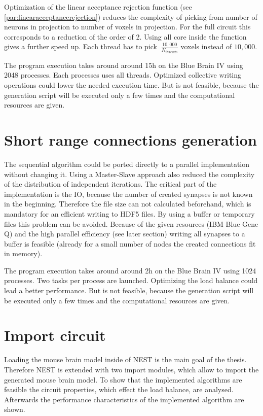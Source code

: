 Optimization of the linear acceptance rejection function (see \ref{par:linearacceptancerejection})
reduces the complexity of picking from number of neurons in projection to number of voxels in projection.
For the full circuit this corresponds to a reduction of the order of 2.
Using all core inside the function gives a further speed up.
Each thread has to pick $~\frac{10,000}{N_{threads}}$ voxels instead of
$10,000$.

The program execution takes around around 15h on the Blue Brain IV using 2048 processes.
Each processes uses all threads. Optimized collective writing operations could 
lower the needed execution time.
But is not feasible, because the generation script will be executed only a few times
and the computational resources are given.



\section{Short range connections generation}
The sequential algorithm could be ported directly to a parallel implementation without changing it.
Using a Master-Slave approach also reduced the complexity of the distribution of independent iterations.
The critical part of the implementation is the IO, because the number of created synapses is not known in the beginning.
Therefore the file size can not calculated beforehand, which is mandatory for an efficient writing to HDF5 files. 
By using a buffer or temporary files this problem can be avoided.
Because of the given resources (IBM Blue Gene Q) and the high parallel efficiency (see later section)
writing all synapses to a buffer is feasible (already for a small number of nodes the created connections fit in memory).

The program execution takes around around 2h on the Blue Brain IV using 1024 processes.
Two tasks per process are launched. Optimizing the load balance could lead a better performance.
But is not feasible, because the generation script will be executed only a few times
and the computational resources are given.

\section{Import circuit}
Loading the mouse brain model inside of NEST is the main goal of the thesis.
Therefore NEST is extended with two import modules, which allow to import the
generated mouse brain model. To show that the implemented algorithms are feasible 
the circuit properties, which effect the load balance, are analysed.
Afterwards the performance characteristics of the implemented algorithm are shown.

